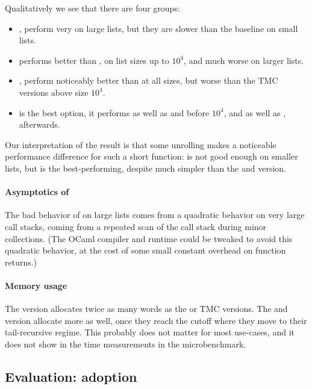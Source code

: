 Qualitatively we see that there are four groups:
\begin{itemize}
\item {},  perform very on large lists, but they
  are slower than the baseline on small lists.
\item {} performs better than ,  on list sizes up to $10^4$, and much worse on larger lists.
\item {},  perform noticeably better than  at all sizes,
  but worse than the TMC versions above size $10^4$.
\item {} is the best option, it performs as well as  and  before $10^4$, and as well as ,  afterwards.
\end{itemize}
Our interpretation of the result is that some unrolling makes a noticeable performance difference for such a short function:  is not good enough on smaller lists, but  is the best-performing, despite much simpler than the  and  version.

\paragraph{Asymptotics of } The bad behavior of  on large lists comes from a quadratic behavior on very large call stacks, coming from a repeated scan of the call stack during minor collections. (The OCaml compiler and runtime could be tweaked to avoid this quadratic behavior, at the cost of some small constant overhead on function returns.)

\paragraph{Memory usage} The  version allocates twice as many words as the  or TMC versions. The  and  version allocate more as well, once they reach the cutoff where they move to their tail-recursive regime. This probably does not matter for most use-cases, and it does not show in the time measurements in the microbenchmark.

\subsection{Evaluation: adoption}

